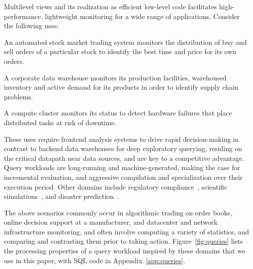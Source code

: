 
Multilevel views and its realization as efficient low-level code
facilitates high-performance, lightweight monitoring for a wide range of
applications. Consider the following uses:

\vspace{-2mm}
\begin{list}{}{ \leftmargin=1em}
\addtolength{\itemsep}{-0.5\baselineskip}
\item An automated stock market trading system monitors the distribution of buy
and sell orders of a particular stock to identify the best time and price for
its own orders.

\item A corporate data warehouse monitors its production facilities, warehoused
inventory and active demand for its products in order to identify
supply chain problems.

\item A compute cluster monitors its status to detect hardware failures
that place distributed tasks at risk of downtime.
\end{list}

\vspace{-1mm}
These uses require frontend analysis systems to drive rapid decision-making in
contrast to backend data warehouses for deep exploratory querying, residing on
the critical datapath near data sources, and are key to a competitive advantage.
Query workloads are long-running and machine-generated, making the case for
incremental evaluation, and aggressive compilation and specialization over their
execution period. Other domains include regulatory
compliance~\cite{basel2}, scientific simulations~\cite{hey2009fourth}, and
disaster prediction~\cite{scholz1973earthquake}.


\vspace{1mm}
The above scenarios commonly occur in algorithmic trading on order books, online
decision support at a manufacturer, and datacenter and network infrastructure
monitoring, and often involve computing a variety of statistics,
and comparing and contrasting them prior to taking action.
Figure~\ref{fig:queries} lists the processing properties of a query workload
inspired by these domains that we use in this paper, with SQL code in
Appendix~\ref{app:queries}.

